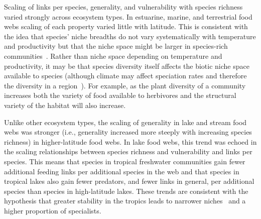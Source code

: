 \documentclass[12pt]{article}
\begin{document}
  Scaling of links per species, generality, and vulnerability with species
  richness varied strongly across ecosystem types. In estuarine, marine, and
  terrestrial food webs scaling of each property varied little with latitude.
  This is consistent with the idea that species' niche breadths do not vary
  systematically with temperature and productivity but that the niche space
  might be larger in species-rich communities~\cite{Davies2007}. Rather than
  niche space depending on temperature and productivity, it may be that species
  diversity itself affects the biotic niche space available to species (although climate
  may affect speciation rates and therefore the diversity in a region~\cite{Currie2004}). 
  For example, as the plant diversity of a community increases both the 
  variety of food available to herbivores and the structural variety of the habitat will also increase.


  Unlike other ecosystem types, the scaling of generality in lake and stream
  food webs was stronger (i.e., generality increased more steeply with
  increasing species richness) in higher-latitude food webs. In lake food webs,
  this trend was echoed in the scaling relationships between species richness
  and vulnerability and links per species. This means that species in tropical
  freshwater communities gain fewer additional feeding links per additional
  species in the web and that species in tropical lakes also gain fewer
  predators, and fewer links in general, per additional species than species
  in high-latitude lakes. These trends are consistent with the hypothesis that
  greater stability in the tropics leads to narrower niches~\cite{Vazquez2004}
  and a higher proportion of specialists. 
\end{document}
